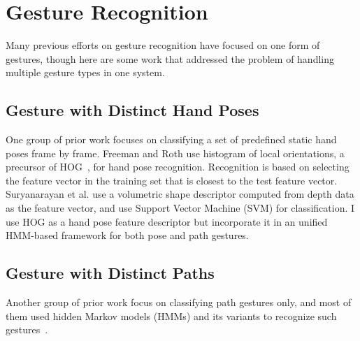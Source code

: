 \section{Gesture Recognition}
Many previous efforts on gesture recognition have focused on one form of
gestures, though here are some work that addressed the problem of handling multiple gesture types in one system.

\subsection{Gesture with Distinct Hand Poses}
One group of prior work focuses on classifying a set of predefined static hand
poses frame by frame. Freeman and Roth \cite{freeman95} use histogram of local
orientations, a precursor of HOG~\cite{dalal05},
for hand pose recognition.
Recognition is based on selecting the feature vector in the training set that is closest to the test feature vector. 
Suryanarayan et al.
\cite{suryanarayan2010} use a volumetric shape descriptor computed from depth
data as the feature vector, and use Support Vector Machine (SVM) for
classification.
I use HOG as a hand pose feature descriptor but incorporate it in an unified HMM-based framework for both pose and path gestures.

\subsection{Gesture with Distinct Paths}
Another group of prior work focus on classifying path gestures only, and most of
them used hidden Markov models (HMMs) and its variants to recognize such
gestures~\cite{Starner95, sharma00}.

